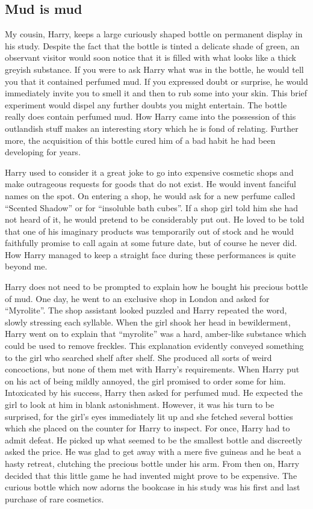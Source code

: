 \documentclass[11pt]{article}
\begin{document}
\subsection{Mud is mud}
\label{sec-1-52}

My cousin, Harry, keeps a large curiously shaped bottle on permanent display in his study. Despite the fact that the bottle is tinted a delicate shade of green, an observant visitor would soon notice that it is filled with what looks like a thick greyish substance. If you were to ask Harry what was in the bottle, he would tell you that it contained perfumed mud. If you expressed doubt or surprise, he would immediately invite you to smell it and then to rub some into your skin. This brief experiment would dispel any further doubts you might entertain. The bottle really does contain perfumed mud. How Harry came into the possession of this outlandish stuff makes an interesting story which he is fond of relating. Further more, the acquisition of this bottle cured him of a bad habit he had been developing for years. 

Harry used to consider it a great joke to go into expensive cosmetic shops and make outrageous requests for goods that do not exist. He would invent fanciful names on the spot. On entering a shop, he would ask for a new perfume called ``Scented Shadow'' or for ``insoluble bath cubes''. If a shop girl told him she had not heard of it, he would pretend to be considerably put out. He loved to be told that one of his imaginary products was temporarily out of stock and he would faithfully promise to call again at some future date, but of course he never did. How Harry managed to keep a straight face during these performances is quite beyond me. 

Harry does not need to be prompted to explain how he bought his precious bottle of mud. One day, he went to an exclusive shop in London and asked for ``Myrolite''. The shop assistant looked puzzled and Harry repeated the word, slowly stressing each syllable. When the girl shook her head in bewilderment, Harry went on to explain that ``myrolite'' was a hard, amber-like substance which could be used to remove freckles. This explanation evidently conveyed something to the girl who searched shelf after shelf. She produced all sorts of weird concoctions, but none of them met with Harry's requirements. When Harry put on his act of being mildly annoyed, the girl promised to order some for him. Intoxicated by his success, Harry then asked for perfumed mud. He expected the girl to look at him in blank astonishment. However, it was his turn to be surprised, for the girl's eyes immediately lit up and she fetched several botties which she placed on the counter for Harry to inspect. For once, Harry had to admit defeat. He picked up what seemed to be the smallest bottle and discreetly asked the price. He was glad to get away with a mere five guineas and he beat a hasty retreat, clutching the precious bottle under his arm. From then on, Harry decided that this little game he had invented might prove to be expensive. The curious bottle which now adorns the bookcase in his study was his first and last purchase of rare cosmetics.
\end{document}

